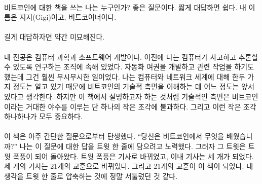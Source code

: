 \paragraph{}
비트코인에 대한 책을 쓰는 나는 누구인가? 좋은 질문이다. 
짧게 대답하면 쉽다. 내 이름은 지지(Gigi)이고, 비트코이너이다.


\paragraph{}
길게 대답하자면 약간 미묘해진다.

\paragraph{}
내 전공은 컴퓨터 과학과 소프트웨어 개발이다. 
이전에 나는 컴퓨터가 사고하고 추론할 수 있도록 연구하는 조직에 속해 있었다. 
자동화 여권을 개발하고 관련 작업을 하기도 했는데 그건 훨씬 무시무시한 일이었다. 
나는 컴퓨터와 네트워크 세계에 대해 한두 가지 정도는 알고 있기 때문에 비트코인의 기술적 측면을 이해하는 데 어느 정도는 앞서 있다고 생각한다.
하지만 이 책에서 설명하고자 하는 것처럼 기술적인 측면은 비트코인이라는 거대한 야수를 이루는 단 하나의 작은 조각에 불과하다. 
그리고 이런 작은 조각 하나하나가 모두 중요하다. 


\paragraph{}
이 책은 아주 간단한 질문으로부터 탄생했다.  
\enquote{당신은 비트코인에서 무엇을 배웠습니까?}
나는 이 질문에 대한 답을 트윗 한 줄에 담으려고 노력했다.
그러자 그 트윗은 트윗 폭풍이 되어 돌아왔다. 트윗 폭풍은 기사로 바뀌었고, 이내 기사는 세 개가 되었다. 
세 개의 기사는 21개의 교훈으로 바뀌었다. 그리고 21개의 교훈이 이 책이 되었다. 내 생각을 트윗 한 줄로 압축하는 것에 정말 서툴렀던 것 같다.


